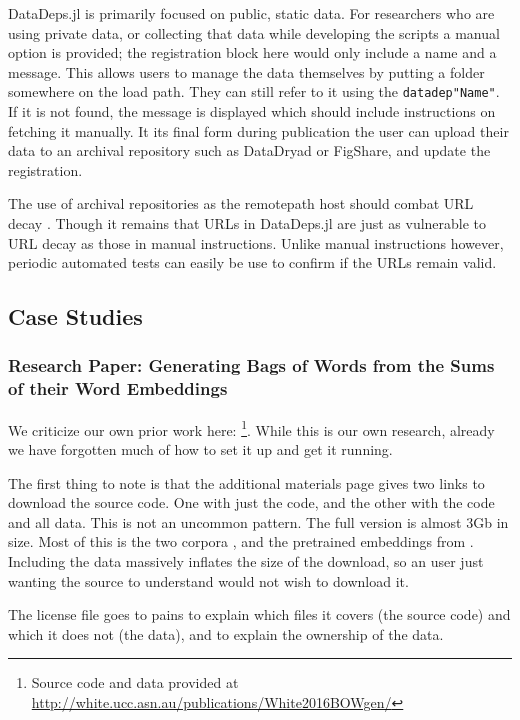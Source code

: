 \documentclass[twoside,11pt]{article}\usepackage{jmlr2e}
\newcommand{\datadep}[1]{\texttt{datadep"{}#1"{}}}
\begin{document}
DataDeps.jl is primarily focused on public, static data.
For researchers who are using private data, or collecting that data while developing the scripts a manual option is provided; the registration block here would only include a name and a message. This allows users to manage the data themselves by putting a folder somewhere on the load path. They can still refer to it using the \datadep{Name}. If it is not found, the message is displayed which should include instructions on fetching it manually.
It its final form during publication the user can upload their data to an archival repository such as DataDryad or FigShare, and update the registration.

The use of archival repositories as the remotepath host should combat URL decay \citep{wren2008url}. Though it remains that URLs in DataDeps.jl are just as vulnerable to URL decay as those in manual instructions.
Unlike manual instructions however, periodic automated tests can easily be use to confirm if the URLs remain valid.




\subsection{Case Studies}\label{sec:case-studies}
\subsubsection{Research Paper: Generating Bags of Words from the Sums of their Word Embeddings}
We criticize our own prior work here: \citet{White2015BOWgen} \footnote{Source code and data provided at \url{http://white.ucc.asn.au/publications/White2016BOWgen/}}.
While this is our own research, already we have forgotten much of how to set it up and get it running.

The first thing to note is that the additional materials page gives two links to download the source code.
One with just the code, and the other with the code and all data.
This is not an uncommon pattern.
The full version is almost 3Gb in size.
Most of this is the two corpora \citep{francis1979brown,moviebook}, and the pretrained embeddings from \citet{pennington2014glove}.
Including the data massively inflates the size of the download, so an user just wanting the source to understand would not wish to download it.

The license file goes to pains to explain which files it covers (the source code) and which it does not (the data), and to explain the ownership of the data.
\end{document}
